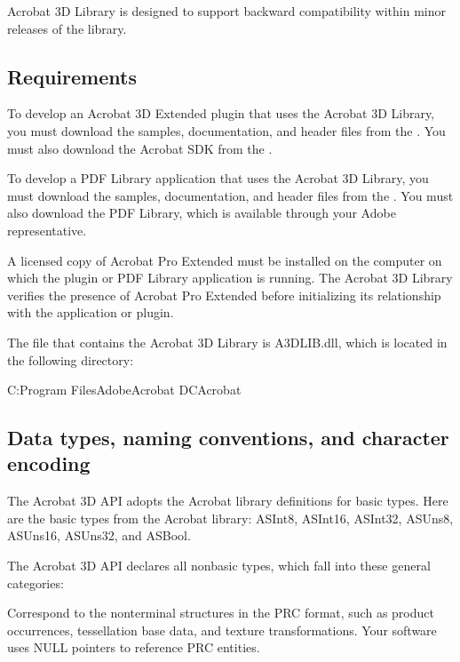 \documentclass[letterpaper,12pt,english,openany,oneside]{sphinxmanual}
\begin{document}
Acrobat 3D Library is designed to support backward compatibility within minor releases of the library.


\subsection{Requirements}
\label{\detokenize{Plugins_A3D_API:requirements}}
To develop an Acrobat 3D Extended plugin that uses the Acrobat 3D Library, you must download the samples, documentation, and header files from the . You must also download the Acrobat SDK from the .

To develop a PDF Library application that uses the Acrobat 3D Library, you must download the samples, documentation, and header files from the . You must also download the PDF Library, which is available through your Adobe representative.

A licensed copy of Acrobat Pro Extended must be installed on the computer on which the plugin or PDF Library application is running. The Acrobat 3D Library verifies the presence of Acrobat Pro Extended before initializing its relationship with the application or plugin.

The file that contains the Acrobat 3D Library is A3DLIB.dll, which is located in the following directory:

C:Program FilesAdobeAcrobat DCAcrobat


\subsection{Data types, naming conventions, and character encoding}
\label{\detokenize{Plugins_A3D_API:data-types-naming-conventions-and-character-encoding}}
The Acrobat 3D API adopts the Acrobat library definitions for basic types. Here are the basic types from the Acrobat library: ASInt8, ASInt16, ASInt32, ASUns8, ASUns16, ASUns32, and ASBool.

The Acrobat 3D API declares all non\sphinxhyphen{}basic types, which fall into these general categories:

 Correspond to the non\sphinxhyphen{}terminal structures in the PRC format, such as product occurrences, tessellation base data, and texture transformations. Your software uses NULL pointers to reference PRC entities.
\end{document}
